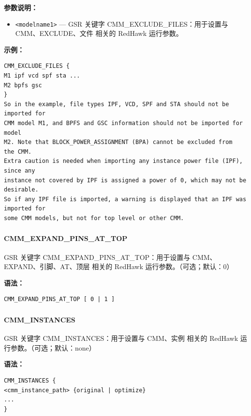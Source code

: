 \textbf{参数说明：}
\begin{itemize}
\item \texttt{<modelname1>} — GSR 关键字 CMM\_EXCLUDE\_FILES：用于设置与 CMM、EXCLUDE、文件 相关的 RedHawk 运行参数。
\end{itemize}

\textbf{示例：}
\begin{lstlisting}
CMM_EXCLUDE_FILES {
M1 ipf vcd spf sta ...
M2 bpfs gsc
}
So in the example, file types IPF, VCD, SPF and STA should not be imported for
CMM model M1, and BPFS and GSC information should not be imported for model
M2. Note that BLOCK_POWER_ASSIGNMENT (BPA) cannot be excluded from
the CMM.
Extra caution is needed when importing any instance power file (IPF), since any
instance not covered by IPF is assigned a power of 0, which may not be desirable.
So if any IPF file is imported, a warning is displayed that an IPF was imported for
some CMM models, but not for top level or other CMM.
\end{lstlisting}

\subsubsection{}
\paragraph*{CMM_EXPAND_PINS_AT_TOP}

GSR 关键字 CMM_EXPAND_PINS_AT_TOP：用于设置与 CMM、EXPAND、引脚、AT、顶层 相关的 RedHawk 运行参数。（可选；默认：0）

\textbf{语法：}
\begin{lstlisting}
CMM_EXPAND_PINS_AT_TOP [ 0 | 1 ]
\end{lstlisting}

\subsubsection{}
\paragraph*{CMM_INSTANCES}

GSR 关键字 CMM_INSTANCES：用于设置与 CMM、实例 相关的 RedHawk 运行参数。（可选；默认：none）

\textbf{语法：}
\begin{lstlisting}
CMM_INSTANCES {
<cmm_instance_path> {original | optimize}
...
}
\end{lstlisting}

